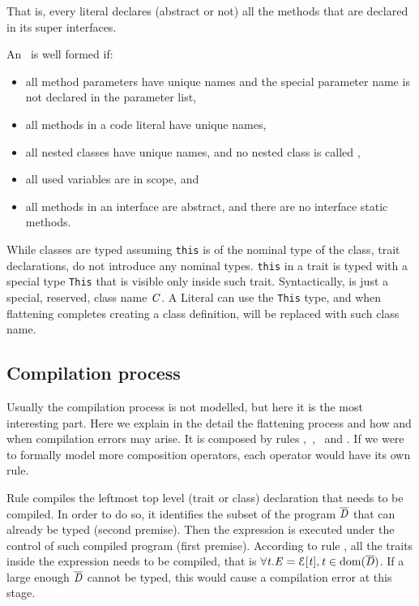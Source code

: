 That is, every literal declares (abstract or not) all the methods that are declared 
in its super interfaces.

\noindent An \mL\ is well formed if:
\begin{itemize}
\item all method parameters have unique names and the special parameter name \Q@this@ is not declared
 in the parameter list,
\item all methods in a code literal have unique names,
\item all nested classes have unique names, and no nested class is called \Q@This@,
\item all used variables are in scope, and
\item all methods in an interface are abstract, and there are no interface static methods.
\end{itemize}


While classes are typed assuming \lstinline{this} is of the nominal type of the
class, trait declarations, do not introduce any nominal types.  \lstinline{this}
in a trait is typed with a special type \lstinline{This} that is visible only
inside such trait. Syntactically, \Q@This@ is just a special, reserved, class name $\mathit{C}$.
A Literal can use the \lstinline{This} type,
and when flattening completes creating a class definition, \Q@This@ will be replaced with such class name.


\subsection{Compilation process}

Usually the compilation process is not modelled, but here it is the most interesting part.
Here we explain in the detail the flattening process and how and when compilation errors may arise.
It is composed by rules ,\ ,\  and .
If we were to formally model more composition operators, each operator would have its own  rule.

Rule 
compiles the leftmost top level (trait or class) declaration that needs to be compiled.
In order to do so,
it identifies the subset of the program $\overline{\mathit{D}}$ that can already be typed (second premise).
Then the expression is executed under the control of such compiled program (first premise).
According to rule , all the traits inside the expression needs to
be compiled, that is $\forall\mathit{t}. \mathit{E}={\cal{E}}[\mathit{t}], \mathit{t}\in\text{dom}(\overline{\mathit{D}})$.
If a large enough $\overline{\mathit{D}}$ cannot be typed, this would cause a compilation error
at this stage.

